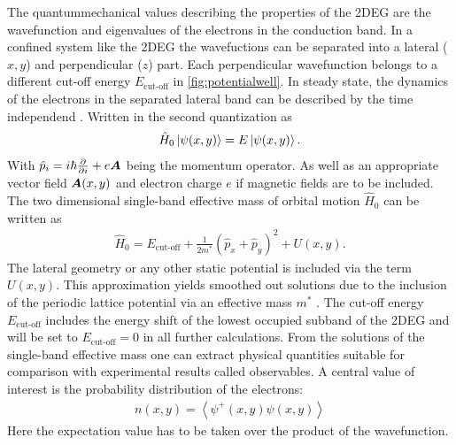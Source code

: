 The quantummechanical values describing the properties of the 2DEG are the wavefunction and eigenvalues of the electrons in the conduction band. In a confined system like the 2DEG the wavefuctions can be separated into a lateral ($x,y$) and perpendicular ($z$) part. Each perpendicular wavefunction belongs to a different cut-off energy $E_{\text{cut-off}}$ in \cref{fig:potentialwell}.
In steady state, the dynamics of the electrons in the separated lateral band can be described by the time independend \sdg{}. Written in the second quantization as
\begin{align}
 \hat{H}_0\left| \psi(x,y) \right> = E \left| \psi(x,y) \right>.
	\label{eqn:effectivemasssdg}
\end{align}
With $\hat{p}_i = i\hbar \frac{\partial }{\partial i} + e\boldsymbol{A}$ being the momentum operator. As well as an appropriate vector field $\boldsymbol{A}(x,y)$ and electron charge $e$ if magnetic fields are to be included. The two dimensional single-band effective mass \hamil{} of orbital motion $\hat{H}_0$ can be written as
\begin{align}
\hat{H}_0 = E_{\text{cut-off}} + \frac{1}{2m^*}(\hat{p}_{x}+\hat{p}_{y})^2+U(x,y).
\end{align}
The lateral geometry or any other static potential is included via the term $U(x,y)$.
This approximation yields smoothed out solutions due to the inclusion of the periodic lattice potential via an effective mass $m^*$ \cite{BastardBrum1986}.
The cut-off energy $E_{\text{cut-off}}$ includes the energy shift of the lowest occupied subband of the 2DEG and will be set to $E_{\text{cut-off}} = 0$ in all further calculations.
From the solutions of the single-band effective mass \sdg{} one can extract physical quantities suitable for comparison with experimental results called observables.
A central value of interest is the probability distribution of the electrons:
\begin{align}
	n(x,y) = \left< \psi^+ (x,y) \psi(x,y)\right>
	\label{eqn:analyticalelectrondensity}
\end{align}
Here the expectation value has to be taken over the product of the wavefunction.
